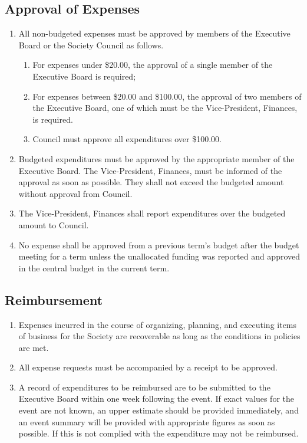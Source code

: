 \subsection{Approval of Expenses}
\begin{enumerate}
\item All non-budgeted expenses must be approved by members of the Executive Board or the Society Council as follows.
\begin{enumerate}
\item For expenses under \$20.00, the approval of a single member of the Executive Board is required;
\item For expenses between \$20.00 and \$100.00, the approval of two members of the Executive Board, one of which must be the Vice-President, Finances, is required.
\item Council must approve all expenditures over \$100.00.
\end{enumerate}
\item Budgeted expenditures must be approved by the appropriate member of the Executive Board. The Vice-President, Finances, must be informed of the approval as soon as possible. They shall not exceed the budgeted amount without approval from Council.
\item The Vice-President, Finances shall report expenditures over the budgeted amount to Council.
\item No expense shall be approved from a previous term's budget after the budget meeting for a term unless the unallocated funding was reported and approved in the central budget in the current term.
\end{enumerate}

\subsection{Reimbursement}
\begin{enumerate}
\item Expenses incurred in the course of organizing, planning, and executing items of business for the Society are recoverable as long as the conditions in policies are met.
\item All expense requests must be accompanied by a receipt to be approved.
\item A record of expenditures to be reimbursed are to be submitted to the Executive Board within one week following the event. If exact values for the event are not known, an upper estimate should be provided immediately, and an event summary will be provided with appropriate figures as soon as possible. If this is not complied with the expenditure may not be reimbursed.
\end{enumerate}

